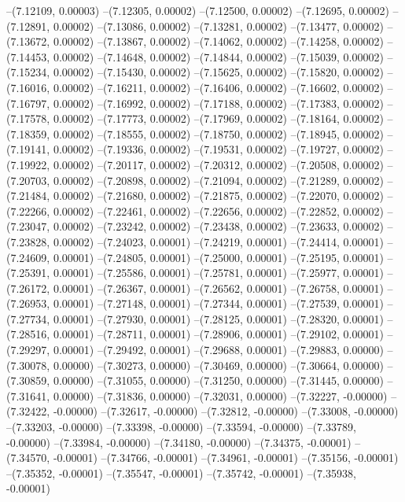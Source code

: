 --(7.12109, 0.00003)
--(7.12305, 0.00002)
--(7.12500, 0.00002)
--(7.12695, 0.00002)
--(7.12891, 0.00002)
--(7.13086, 0.00002)
--(7.13281, 0.00002)
--(7.13477, 0.00002)
--(7.13672, 0.00002)
--(7.13867, 0.00002)
--(7.14062, 0.00002)
--(7.14258, 0.00002)
--(7.14453, 0.00002)
--(7.14648, 0.00002)
--(7.14844, 0.00002)
--(7.15039, 0.00002)
--(7.15234, 0.00002)
--(7.15430, 0.00002)
--(7.15625, 0.00002)
--(7.15820, 0.00002)
--(7.16016, 0.00002)
--(7.16211, 0.00002)
--(7.16406, 0.00002)
--(7.16602, 0.00002)
--(7.16797, 0.00002)
--(7.16992, 0.00002)
--(7.17188, 0.00002)
--(7.17383, 0.00002)
--(7.17578, 0.00002)
--(7.17773, 0.00002)
--(7.17969, 0.00002)
--(7.18164, 0.00002)
--(7.18359, 0.00002)
--(7.18555, 0.00002)
--(7.18750, 0.00002)
--(7.18945, 0.00002)
--(7.19141, 0.00002)
--(7.19336, 0.00002)
--(7.19531, 0.00002)
--(7.19727, 0.00002)
--(7.19922, 0.00002)
--(7.20117, 0.00002)
--(7.20312, 0.00002)
--(7.20508, 0.00002)
--(7.20703, 0.00002)
--(7.20898, 0.00002)
--(7.21094, 0.00002)
--(7.21289, 0.00002)
--(7.21484, 0.00002)
--(7.21680, 0.00002)
--(7.21875, 0.00002)
--(7.22070, 0.00002)
--(7.22266, 0.00002)
--(7.22461, 0.00002)
--(7.22656, 0.00002)
--(7.22852, 0.00002)
--(7.23047, 0.00002)
--(7.23242, 0.00002)
--(7.23438, 0.00002)
--(7.23633, 0.00002)
--(7.23828, 0.00002)
--(7.24023, 0.00001)
--(7.24219, 0.00001)
--(7.24414, 0.00001)
--(7.24609, 0.00001)
--(7.24805, 0.00001)
--(7.25000, 0.00001)
--(7.25195, 0.00001)
--(7.25391, 0.00001)
--(7.25586, 0.00001)
--(7.25781, 0.00001)
--(7.25977, 0.00001)
--(7.26172, 0.00001)
--(7.26367, 0.00001)
--(7.26562, 0.00001)
--(7.26758, 0.00001)
--(7.26953, 0.00001)
--(7.27148, 0.00001)
--(7.27344, 0.00001)
--(7.27539, 0.00001)
--(7.27734, 0.00001)
--(7.27930, 0.00001)
--(7.28125, 0.00001)
--(7.28320, 0.00001)
--(7.28516, 0.00001)
--(7.28711, 0.00001)
--(7.28906, 0.00001)
--(7.29102, 0.00001)
--(7.29297, 0.00001)
--(7.29492, 0.00001)
--(7.29688, 0.00001)
--(7.29883, 0.00000)
--(7.30078, 0.00000)
--(7.30273, 0.00000)
--(7.30469, 0.00000)
--(7.30664, 0.00000)
--(7.30859, 0.00000)
--(7.31055, 0.00000)
--(7.31250, 0.00000)
--(7.31445, 0.00000)
--(7.31641, 0.00000)
--(7.31836, 0.00000)
--(7.32031, 0.00000)
--(7.32227, -0.00000)
--(7.32422, -0.00000)
--(7.32617, -0.00000)
--(7.32812, -0.00000)
--(7.33008, -0.00000)
--(7.33203, -0.00000)
--(7.33398, -0.00000)
--(7.33594, -0.00000)
--(7.33789, -0.00000)
--(7.33984, -0.00000)
--(7.34180, -0.00000)
--(7.34375, -0.00001)
--(7.34570, -0.00001)
--(7.34766, -0.00001)
--(7.34961, -0.00001)
--(7.35156, -0.00001)
--(7.35352, -0.00001)
--(7.35547, -0.00001)
--(7.35742, -0.00001)
--(7.35938, -0.00001)
